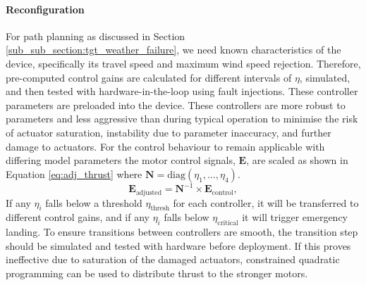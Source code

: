 \paragraph{Reconfiguration}
For path planning as discussed in Section \ref{sub_sub_section:tgt_weather_failure}, we need known characteristics of the device, specifically its travel speed and maximum wind speed rejection. Therefore, pre-computed control gains are calculated for different intervals of $\eta$, simulated, and then tested with hardware-in-the-loop using fault injections. These controller parameters are preloaded into the device. These controllers are more robust to parameters and less aggressive than during typical operation to minimise the risk of actuator saturation, instability due to parameter inaccuracy, and further damage to actuators. For the control behaviour to remain applicable with differing model parameters the motor control signals, $\mathbf{E}$, are scaled as shown in Equation \ref{eq:adj_thrust} where $\mathbf{N} = \text{diag}(\eta_1, \dots,\eta_4)$.
\begin{equation}\label{eq:adj_thrust}
    \mathbf{E}_{\text{adjusted}} = \mathbf{N}^{-1}\times \mathbf{E}_{\text{control}}, 
\end{equation}
If any $\eta_i$ falls below a threshold $\eta_{\text{thresh}}$ for each controller, it will be transferred to different control gains, and if any $\eta_i$ falls below $\eta_{\text{critical}}$ it will trigger emergency landing. To ensure transitions between controllers are smooth, the transition step should be simulated and tested with hardware before deployment. If this proves ineffective due to saturation of the damaged actuators, constrained quadratic programming can be used \cite{JOHANSEN2013} to distribute thrust to the stronger motors.

